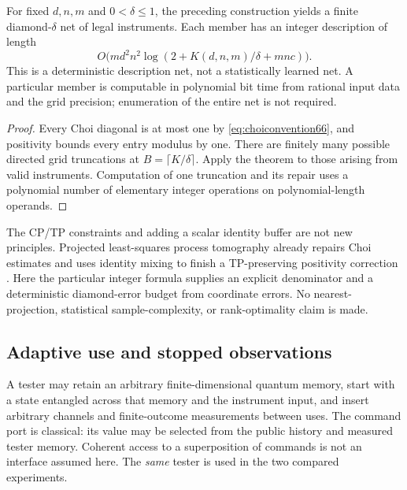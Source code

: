 \begin{corollary}\label{cor:instrumentnet66}
For fixed $d,n,m$ and $0<\delta\le1$, the preceding construction yields
a finite diamond-$\delta$ net of legal instruments. Each member has
an integer description of length
\[
 O\bigl(m d^2n^2\log(2+K(d,n,m)/\delta+mnc)\bigr).
\]
This is a deterministic description net, not a statistically learned net.
A particular member is computable in polynomial bit time from rational
input data and the grid precision; enumeration of the entire net is
not required.
\end{corollary}
\begin{proof}
Every Choi diagonal is at most one by \eqref{eq:choiconvention66}, and
positivity bounds every entry modulus by one. There are finitely many
possible directed grid truncations at $B=\lceil K/\delta\rceil$.
Apply the theorem to those arising from valid instruments. Computation
of one truncation and its repair uses a polynomial number of elementary
integer operations on polynomial-length operands.
\end{proof}
The CP/TP constraints and adding a scalar identity buffer are not new
principles. Projected least-squares process tomography already repairs
Choi estimates and uses identity mixing to finish a TP-preserving
positivity correction \cite[Section~4]{PLS66}. Here the particular
integer formula supplies an explicit denominator and a deterministic
diamond-error budget from coordinate errors. No nearest-projection,
statistical sample-complexity, or rank-optimality claim is made.

\subsection{Adaptive use and stopped observations}
A tester may retain an arbitrary finite-dimensional quantum memory,
start with a state entangled across that memory and the instrument
input, and insert arbitrary channels and finite-outcome measurements between uses.
The command port is classical: its value may be selected from the
public history and measured tester memory. Coherent access to a
superposition of commands is not an interface assumed here. The
\emph{same} tester is used in the two compared experiments.

